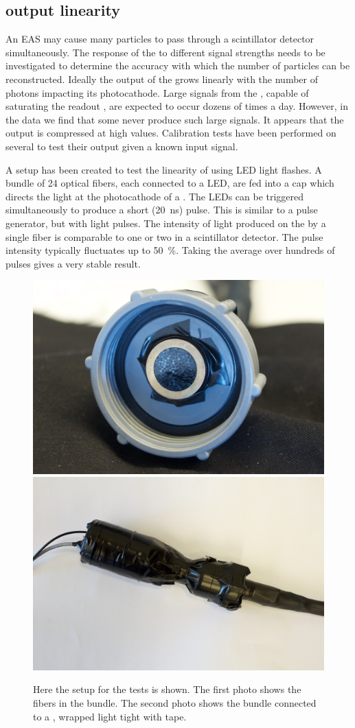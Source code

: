 \subsection{\pmt output linearity}
\label{sub:pmt_linearity}

An EAS may cause many particles to pass through a scintillator detector simultaneously. The response of the \pmt to different signal strengths needs to be investigated to determine the accuracy with which the number of particles can be reconstructed. Ideally the output of the \pmt grows linearly with the number of photons impacting its photocathode. Large signals from the \pmt, capable of saturating the readout \adcs, are expected to occur dozens of times a day. However, in the data we find that some \pmts never produce such large signals. It appears that the output is compressed at high values. Calibration tests have been performed on several \pmts to test their output given a known input signal.

A setup has been created to test the linearity of \pmts using LED light flashes. A bundle of 24 optical fibers, each connected to a LED, are fed into a cap which directs the light at the photocathode of a \pmt. The LEDs can be triggered simultaneously to produce a short (\SI{20}{\ns}) pulse. This is similar to a pulse generator, but with light pulses. The intensity of light produced on the \pmt by a single fiber is comparable to one or two \mip in a scintillator detector. The \pmt pulse intensity typically fluctuates up to \SI{50}{\percent}. Taking the average over hundreds of pulses gives a very stable result.

\begin{figure}
    \centering
    \includegraphics[width=0.45\linewidth]{plots/station/ARN_085351.jpg}
    \includegraphics[width=0.45\linewidth]{plots/station/ARN_085349.jpg}
    \caption{Here the setup for the \pmt tests is shown. The first photo shows the fibers in the bundle. The second photo shows the bundle connected to a \nikhef \pmt, wrapped light tight with tape.}
    \label{fig:pmt_test_setup}
\end{figure}

